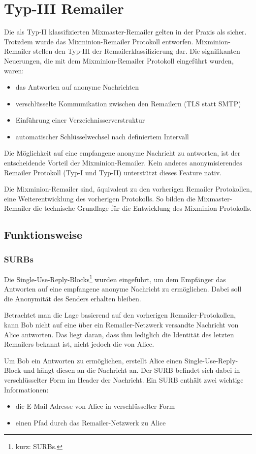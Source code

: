 \chapter{Typ-III Remailer}
Die als Typ-II klassifizierten Mixmaster-Remailer gelten in der Praxis als sicher. Trotzdem wurde das Mixminion-Remailer Protokoll entworfen. Mixminion-Remailer stellen den Typ-III der Remailerklassifizierung dar. Die signifikanten Neuerungen, die mit dem Mixminion-Remailer Protokoll eingeführt wurden, waren:
\begin{itemize}
\item das Antworten auf anonyme Nachrichten
\item verschlüsselte Kommunikation zwischen den Remailern (TLS statt SMTP)
\item Einführung einer Verzeichnisserverstruktur
\item automatischer Schlüsselwechsel nach definiertem Intervall
\end{itemize}

Die Möglichkeit auf eine empfangene anonyme Nachricht zu antworten, ist der entscheidende Vorteil der Mixminion-Remailer. Kein anderes anonymisierendes Remailer Protokoll (Typ-I und Typ-II) unterstützt dieses Feature nativ.

Die Mixminion-Remailer sind, äquivalent zu den vorherigen Remailer Protokollen, eine Weiterentwicklung des vorherigen Protokolls. So bilden die Mixmaster-Remailer die technische Grundlage für die Entwicklung des Mixminion Protokolls.

\section{Funktionsweise}
\subsection{SURBs}
Die Single-Use-Reply-Blocks\footnote{kurz: SURBs.} wurden eingeführt, um dem Empfänger das Antworten auf eine empfangene anonyme Nachricht zu ermöglichen. Dabei soll die Anonymität des  Senders erhalten bleiben.

Betrachtet man die Lage basierend auf den vorherigen Remailer-Protokollen, kann Bob nicht auf eine über ein Remailer-Netzwerk versandte Nachricht von Alice antworten. Das liegt daran, dass ihm lediglich die Identität des letzten Remailers bekannt ist, nicht jedoch die von Alice.

Um Bob ein Antworten zu ermöglichen, erstellt Alice einen Single-Use-Reply-Block und hängt diesen an die Nachricht an. Der SURB befindet sich dabei in verschlüsselter Form im Header der Nachricht. 
Ein SURB enthält zwei wichtige Informationen:
\begin{itemize}
\item die E-Mail Adresse von Alice in verschlüsselter Form
\item einen Pfad durch das Remailer-Netzwerk zu Alice
\end{itemize}

